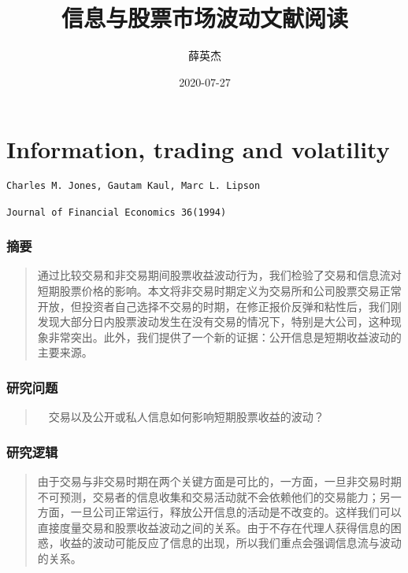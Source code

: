 \documentclass[
]{article}
\title{信息与股票市场波动文献阅读}
\author{薛英杰}
\date{2020-07-27}
\begin{document}
\maketitle

\hypertarget{information-trading-and-volatility}{%
\section{Information, trading and
volatility}\label{information-trading-and-volatility}}

\begin{verbatim}
Charles M. Jones, Gautam Kaul, Marc L. Lipson

Journal of Financial Economics 36(1994)
\end{verbatim}

\hypertarget{ux6458ux8981}{%
\subsubsection{摘要}\label{ux6458ux8981}}

\begin{quote}
通过比较交易和非交易期间股票收益波动行为，我们检验了交易和信息流对短期股票价格的影响。本文将非交易时期定义为交易所和公司股票交易正常开放，但投资者自己选择不交易的时期，在修正报价反弹和粘性后，我们刚发现大部分日内股票波动发生在没有交易的情况下，特别是大公司，这种现象非常突出。此外，我们提供了一个新的证据：公开信息是短期收益波动的主要来源。
\end{quote}

\hypertarget{ux7814ux7a76ux95eeux9898}{%
\subsubsection{研究问题}\label{ux7814ux7a76ux95eeux9898}}

\begin{quote}
　交易以及公开或私人信息如何影响短期股票收益的波动？
\end{quote}

\hypertarget{ux7814ux7a76ux903bux8f91}{%
\subsubsection{研究逻辑}\label{ux7814ux7a76ux903bux8f91}}

\begin{quote}
由于交易与非交易时期在两个关键方面是可比的，一方面，一旦非交易时期不可预测，交易者的信息收集和交易活动就不会依赖他们的交易能力；另一方面，一旦公司正常运行，释放公开信息的活动是不改变的。这样我们可以直接度量交易和股票收益波动之间的关系。由于不存在代理人获得信息的困惑，收益的波动可能反应了信息的出现，所以我们重点会强调信息流与波动的关系。
\end{quote}
\end{document}
